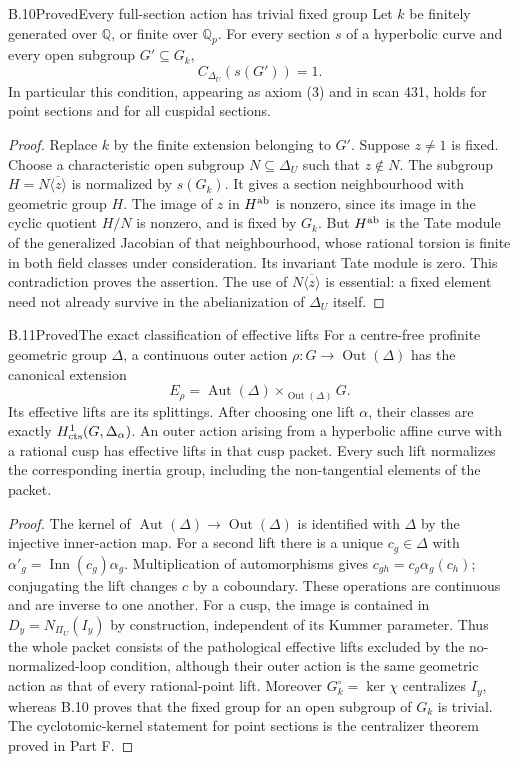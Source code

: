 \begin{statement}{B.10}{Proved}{Every full-section action has trivial fixed group}
Let $k$ be finitely generated over $\mathbb Q$, or finite over
$\mathbb Q_p$.  For every section $s$ of a hyperbolic curve and every
open subgroup $G'\subseteq G_k$,
\[
 C_{\Delta_U}(s(G'))=1.
\]
In particular this condition, appearing as axiom (3) and in scan 431,
holds for point sections and for all cuspidal sections.
\end{statement}
\begin{proof}
Replace $k$ by the finite extension belonging to $G'$.  Suppose
$z\ne1$ is fixed.  Choose a characteristic open subgroup
$N\subseteq\Delta_U$ such that $z\notin N$.  The subgroup
$H=N\overline{\langle z\rangle}$ is normalized by $s(G_k)$.
It gives a section neighbourhood with geometric group $H$.
The image of $z$ in $H^{\rm ab}$ is nonzero, since its image in the
cyclic quotient $H/N$ is nonzero, and is fixed by $G_k$.
But $H^{\rm ab}$ is the Tate module of the generalized Jacobian of
that neighbourhood, whose rational torsion is finite in both field
classes under consideration.  Its invariant Tate module is zero.
This contradiction proves the assertion.  The use of
$N\overline{\langle z\rangle}$ is essential: a fixed element need not
already survive in the abelianization of $\Delta_U$ itself.
\end{proof}

\begin{statement}{B.11}{Proved}{The exact classification of effective lifts}
For a centre-free profinite geometric group $\Delta$, a continuous
outer action $\rho:G\to\operatorname{Out}(\Delta)$ has the canonical
extension
\[
 E_\rho=\operatorname{Aut}(\Delta)
             \times_{\operatorname{Out}(\Delta)}G.
\]
Its effective lifts are its splittings.  After choosing one lift
$\alpha$, their classes are exactly $H^1_{\rm cts}(G,\Delta_\alpha)$.
An outer action arising from a hyperbolic affine curve with a rational
cusp has effective lifts in that cusp packet.  Every such lift
normalizes the corresponding inertia group, including the
non-tangential elements of the packet.
\end{statement}
\begin{proof}
The kernel of $\operatorname{Aut}(\Delta)\to\operatorname{Out}(\Delta)$
is identified with $\Delta$ by the injective inner-action map.
For a second lift there is a unique $c_g\in\Delta$ with
$\alpha'_g=\operatorname{Inn}(c_g)\alpha_g$.  Multiplication of
automorphisms gives
$c_{gh}=c_g\alpha_g(c_h)$; conjugating the lift changes $c$ by a
coboundary.  These operations are continuous and are inverse to one
another.  For a cusp, the image is contained in $D_y=N_{\Pi_U}(I_y)$
by construction, independent of its Kummer parameter.  Thus the
whole packet consists of the pathological effective lifts excluded
by the no-normalized-loop condition, although their outer action is
the same geometric action as that of every rational-point lift.
Moreover $G_k^\circ=\ker\chi$ centralizes $I_y$, whereas B.10 proves
that the fixed group for an open subgroup of $G_k$ is trivial.
The cyclotomic-kernel statement for point sections is the
centralizer theorem proved in Part F.
\end{proof}


